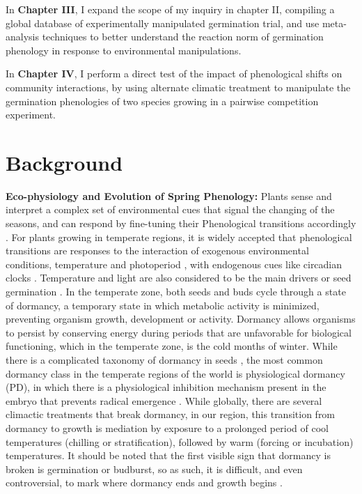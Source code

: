 \documentclass{article}\usepackage[]{graphicx}\usepackage[]{color}
\begin{document}
\par In \textbf{Chapter III}, I expand the scope of my inquiry in chapter II, compiling a global database of experimentally manipulated germination trial, and use meta-analysis techniques to better understand the reaction norm of germination phenology in response to environmental manipulations.
\par In \textbf{Chapter IV}, I perform a direct test of the impact of phenological shifts on community interactions, by using alternate climatic treatment to manipulate the germination phenologies of two species growing in a pairwise competition experiment.

\section*{Background}
\indent\indent\textbf{Eco-physiology and Evolution of Spring Phenology:} Plants sense and interpret a complex set of environmental cues that signal the changing of the seasons, and can respond by fine-tuning their Phenological transitions accordingly \citep{Vitasse2010}. For plants growing in temperate regions, it is widely accepted that phenological transitions are responses to the interaction of exogenous environmental conditions, temperature and photoperiod \citep{Forrest2010}, with endogenous cues like circadian clocks \citep{Visser2010}. Temperature and light are also considered to be the main drivers or seed germination \citep{Finch-Savage2006}. In the temperate zone, both seeds and buds cycle through a state of dormancy, a temporary state in which metabolic activity is minimized, preventing organism growth, development or activity. Dormancy allows organisms to persist by conserving energy during periods that are unfavorable for biological functioning, which in the temperate zone, is the cold months of winter. While there is a complicated taxonomy of dormancy in seeds \citep{Baskin2004}, the most common dormancy class in the temperate regions of the world is physiological dormancy (PD), in which there is a physiological inhibition mechanism present in the embryo that prevents radical emergence \citep{Finch-Savage2006}. While globally, there are several climactic treatments that break dormancy, in our region, this transition from dormancy to growth is mediation by exposure to a prolonged period of cool temperatures (chilling or stratification), followed by warm (forcing or incubation) temperatures. It should be noted that the first visible sign that dormancy is broken is germination or budburst, so as such, it is difficult, and even controversial, to mark where dormancy ends and growth begins \citep{Long2015,Bewley1997}.
\end{document}
